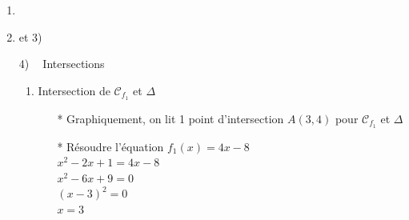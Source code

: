 \begin{enumerate} 

\item {}\\

\item et 3)\\
\centerline{}

\setcounter{enumi}{4} 

4) $\; \;$ Intersections 


\begin{enumerate}
\renewcommand{\theenumi}{\alph{enumi})}

\item Intersection de $\mathcal{C}_{f_1}$ et $\Delta$

\begin{itemize}
\item [*] Graphiquement, on lit 1 point d'intersection  $A(3, 4)$  pour $\mathcal{C}_{f_1}$ et $\Delta$

\item [*] Résoudre l'équation $f_1(x) = 4x - 8$\\

$  x^2 -2x + 1 = 4x -8 $\\
$  x^2 -6x +9 = 0 $\\
$  (x - 3)^2 = 0 $ \\
$ x = 3 $ \\


\end{itemize}
\end{enumerate}
\end{enumerate}
